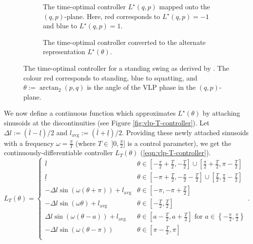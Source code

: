 \begin{figure}
   \centering
   \begin{subfigure}[t]{0.45\textwidth}
      
      \caption{The time-optimal controller \(L^\star(q,p)\) mapped onto the
      \((q,p)\)-plane. Here, red corresponds to \(L^\star(q,p) = -1\) and blue
      to \(L^\star(q,p) = 1\).}
      \label{fig:vlp-optimal-controller-qp-plane}
   \end{subfigure}
   \hfill
   \begin{subfigure}[t]{0.45\textwidth}
      
      \caption{The time-optimal controller converted to the alternate
      representation \(L^\star(\theta)\).}
      \label{fig:vlp-optimal-controller}
   \end{subfigure}
   \caption{The time-optimal controller for a standing swing as derived by
      \cite{pumping_swing_standing_squatting}. The colour red
      corresponds to standing, blue to squatting, and 
      \(\theta := \arctan_2(p,q)\) is the angle of the VLP phase in the
      \((q,p)\)-plane.}
\end{figure}

We now define a continuous function which
approximates \(L^\star(\theta)\) by attaching sinusoids at the
discontinuities (see Figure \ref{fig:vlp-T-controller}). 
Let \(\Delta l := (\overline{l} - \underline{l})/2\) and 
\(l_{\text{avg}} := (\overline{l} + \underline{l})/2\).
Providing these newly attached sinusoids with a frequency \(\omega = \frac{\pi}{T}\) 
(where \(T \in \, ]0,\frac{\pi}{2}]\) is a control parameter), we get the
continuously-differentiable controller \(L_T(\theta)\) (\ref{eqn:vlp-T-controller}).
\begin{equation}\label{eqn:vlp-T-controller}
   L_T(\theta) = \begin{cases}
      \overline{l} & \theta \in \left[-\frac{\pi}{2} + \frac{T}{2}, -\frac{T}{2}\right] 
      \cup \left[\frac{\pi}{2} + \frac{T}{2}, \pi - \frac{T}{2}\right] \\
      \underline{l} & \theta \in \left[-\pi + \frac{T}{2}, -\frac{\pi}{2} - \frac{T}{2}\right] 
      \cup \left[\frac{T}{2}, \frac{\pi}{2} - \frac{T}{2}\right] \\
      -\Delta l \sin(\omega(\theta + \pi)) + l_{\text{avg}} & \theta \in
      \left[-\pi,-\pi + \frac{T}{2}\right] \\
      -\Delta l \sin(\omega \theta) + l_\text{avg} & \theta \in [-\frac{T}{2},
      \frac{T}{2}] \\
      \Delta l \sin(\omega(\theta - a)) + l_\text{avg} & 
      \theta \in \left[a - \frac{T}{2}, a + \frac{T}{2}\right] \text{ for } 
      a \in \left\{-\frac{\pi}{2}, \frac{\pi}{2}\right\} \\
      -\Delta l \sin(\omega(\theta-\pi)) & \theta \in \left[\pi - \frac{T}{2},\pi\right] \\
   \end{cases}
   .
\end{equation}

